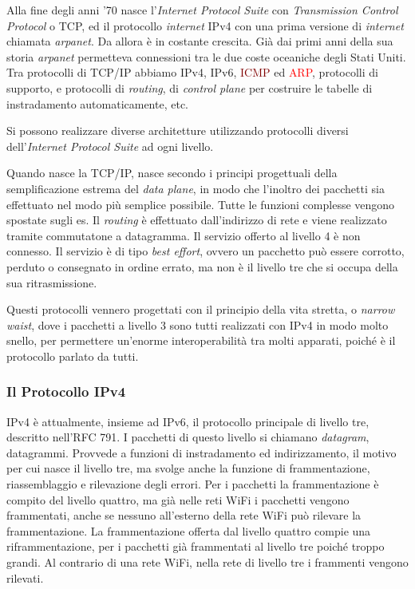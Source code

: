 \documentclass{article}
\numberwithin{equation}{subsection}
\begin{document}
Alla fine degli anni '70 nasce l'\textit{Internet Protocol Suite} con \textit{Transmission Control Protocol} o \textcolor{Bittersweet}{TCP}, ed il protocollo \textit{internet} \textcolor{BurntOrange}{IPv4} con una prima versione di \textit{internet} 
chiamata \textit{arpanet}. Da allora è in costante crescita. Già dai primi anni della sua storia \textit{arpanet} permetteva connessioni tra le due coste oceaniche degli Stati 
Uniti. 
Tra  protocolli di \textcolor{Bittersweet}{TCP}/\textcolor{Bittersweet}{IP} abbiamo \textcolor{BurntOrange}{IPv4}, \textcolor{OliveGreen}{IPv6}, \textcolor{Maroon}{ICMP} ed \textcolor{Red}{ARP}, protocolli di supporto, e protocolli di \textit{routing}, di \textit{control plane} per costruire le tabelle di instradamento 
automaticamente, etc.

Si possono realizzare diverse architetture utilizzando protocolli diversi dell'\textit{Internet Protocol Suite} ad ogni livello. 

Quando nasce la \textcolor{Bittersweet}{TCP}/\textcolor{Bittersweet}{IP}, nasce secondo i principi progettuali della semplificazione estrema del \textit{data plane}, in modo che l'inoltro dei pacchetti sia 
effettuato nel modo più semplice possibile. Tutte le funzioni complesse vengono spostate sugli \textcolor{Periwinkle}{es}. Il \textit{routing} è effettuato dall'indirizzo di rete e viene realizzato 
tramite commutatone a datagramma. Il servizio offerto al livello 4 è non connesso. Il servizio è di tipo \textit{best effort}, ovvero un pacchetto può essere corrotto, 
perduto o consegnato in ordine errato, ma non è il livello tre che si occupa della sua ritrasmissione. 

Questi protocolli vennero progettati con il principio della vita stretta, o \textit{narrow waist}, dove i pacchetti a livello 3 sono tutti realizzati con \textcolor{BurntOrange}{IPv4} in modo molto snello, per permettere un'enorme 
interoperabilità tra molti apparati, poiché è il protocollo parlato da tutti. 

\subsubsection{Il Protocollo \textcolor{BurntOrange}{IPv4}}

\textcolor{BurntOrange}{IPv4} è attualmente, insieme ad \textcolor{OliveGreen}{IPv6}, il protocollo principale di livello tre, descritto nell'RFC 791. I pacchetti di questo livello si chiamano \textit{datagram}, datagrammi. 
Provvede a funzioni di instradamento ed indirizzamento, il motivo per cui nasce il livello tre, ma svolge anche la funzione di frammentazione, riassemblaggio e rilevazione degli errori. 
Per i pacchetti la frammentazione è compito del livello quattro, ma già nelle reti \textcolor{Sepia}{WiFi} i pacchetti vengono frammentati, anche se nessuno all'esterno della rete 
\textcolor{Sepia}{WiFi} può rilevare la frammentazione. La frammentazione offerta dal livello quattro compie una riframmentazione, per i pacchetti già frammentati al livello tre 
poiché troppo grandi. Al contrario di una rete \textcolor{Sepia}{WiFi}, nella rete di livello tre i frammenti vengono rilevati. 
\end{document}
